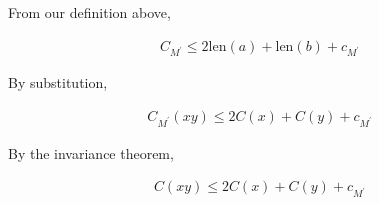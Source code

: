 \documentclass[11pt,addpoints,answers]{exam}
\newcommand{\1}{\mathbf{1}}
\begin{document}
From our definition above,

\begin{align*}
    C_{M^\prime} \leq 2 \text{len}(a) + \text{len}(b) + c_{M^\prime}
\end{align*}

By substitution,

\begin{align*}
     C_{M^\prime}(xy) \leq 2 C(x) + C(y) + c_{M^\prime}
\end{align*}

By the invariance theorem, 

\begin{align*}
    C(xy) \leq 2 C(x) + C(y) + c_{M^\prime}
\end{align*}
\end{document}
